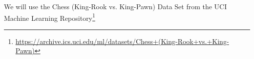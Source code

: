 We will use the Chess (King-Rook vs. King-Pawn) Data Set from the UCI Machine
Learning Repository\footnote{
\url{https://archive.ics.uci.edu/ml/datasets/Chess+(King-Rook+vs.+King-Pawn)}
}
